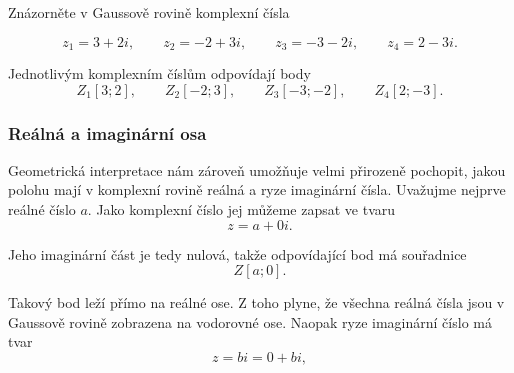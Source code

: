 \documentclass[12pt,a4paper]{article}
\begin{document}
\begin{examplebox}
    Znázorněte v Gaussově rovině komplexní čísla

    \[
        z_1=3+2i, \qquad z_2=-2+3i, \qquad z_3=-3-2i, \qquad z_4=2-3i.
    \]

    Jednotlivým komplexním číslům odpovídají body
    \[
        Z_1[3;2], \qquad Z_2[-2;3], \qquad Z_3[-3;-2], \qquad Z_4[2;-3].
    \]
    \begin{center}
    \end{center}
\end{examplebox}



\subsubsection*{Reálná a imaginární osa}
Geometrická interpretace nám zároveň umožňuje velmi přirozeně pochopit,
jakou polohu mají v komplexní rovině reálná a ryze imaginární čísla.
Uvažujme nejprve reálné číslo $a$. Jako komplexní číslo jej můžeme zapsat ve tvaru
\[
    z=a+0i.
\]

Jeho imaginární část je tedy nulová, takže odpovídající bod má souřadnice
\[
    Z[a;0].
\]

Takový bod leží přímo na reálné ose. 
Z toho plyne, že všechna reálná čísla jsou v Gaussově rovině zobrazena na vodorovné ose.
Naopak ryze imaginární číslo má tvar
\[
    z=bi=0+bi,
\]
\end{document}
